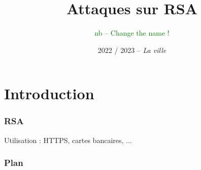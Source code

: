 \documentclass{beamer}
\title{Attaques sur RSA}
\author{\textcolor{green}{nb -- Change the name !}} %
\date{2022 / 2023 -- \textit{La ville}}
\begin{document}
    \frame{\titlepage}

    \section{Introduction}


    \begin{frame}
        \frametitle{RSA}

        \begin{center}

            \vspace{6pt}
            
            Utilisation : HTTPS, cartes bancaires, ...
        \end{center}
    \end{frame}

    \begin{frame}
        \frametitle{Plan}

        \begin{multicols}{2}
            \tableofcontents
        \end{multicols}
    \end{frame}
\end{document}
